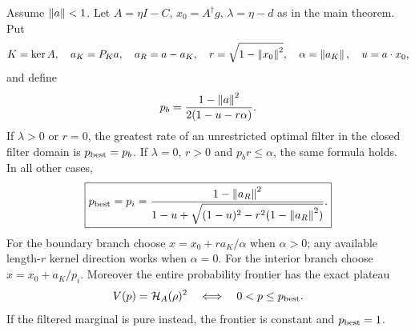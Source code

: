 \begin{theorem}\label{thm:bestrate}
Assume $\left\lVert a\right\rVert<1$. Let $A=\eta I-C$, $x_0=A^\dagger g$, $\lambda=\eta-d$ as in the main
theorem. Put
\[
 K=\ker A,\quad a_K=P_Ka,\quad a_R=a-a_K,\quad
 r=\sqrt{1-\left\lVert x_0\right\rVert^2},\quad\alpha=\left\lVert a_K\right\rVert,\quad u=a\cdot x_0,
\]
and define
\begin{equation}\label{eq:pb}
 p_b=\frac{1-\left\lVert a\right\rVert^2}{2(1-u-r\alpha)}.
\end{equation}
If $\lambda>0$ or $r=0$, the greatest rate of an unrestricted optimal
filter in the closed filter domain is $p_{\rm best}=p_b$.
If $\lambda=0$, $r>0$ and $p_br\leq\alpha$, the same formula holds.
In all other cases,
\begin{equation}\label{eq:pi}\boxed{
 p_{\rm best}=p_i=
 \frac{1-\left\lVert a_R\right\rVert^2}
 {1-u+\sqrt{(1-u)^2-r^2(1-\left\lVert a_R\right\rVert^2)}}.}
\end{equation}
For the boundary branch choose
$x=x_0+r a_K/\alpha$ when $\alpha>0$; any available length-$r$
kernel direction works when $\alpha=0$.
For the interior branch choose $x=x_0+a_K/p_i$.
Moreover the entire probability frontier has the exact plateau
\begin{equation}\label{eq:plateau}
 V(p)=\mathcal H_A(\rho)^2\quad\Longleftrightarrow\quad0<p\leq p_{\rm best}.
\end{equation}
If the filtered marginal is pure instead, the frontier is constant and
$p_{\rm best}=1$.
\end{theorem}
